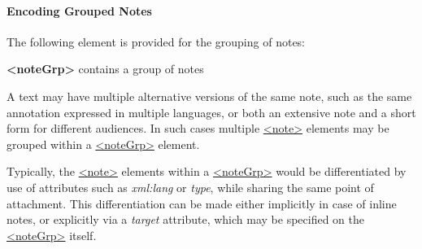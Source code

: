 \paragraph[{Encoding Grouped Notes}]{Encoding Grouped Notes}\label{CONONOGR}\par
The following element is provided for the grouping of notes: 
\begin{sansreflist}
  
\item [\textbf{<noteGrp>}] contains a group of notes
\end{sansreflist}
\par
A text may have multiple alternative versions of the same note, such as the same annotation expressed in multiple languages, or both an extensive note and a short form for different audiences. In such cases multiple \hyperref[TEI.note]{<note>} elements may be grouped within a \hyperref[TEI.noteGrp]{<noteGrp>} element.\par
Typically, the \hyperref[TEI.note]{<note>} elements within a \hyperref[TEI.noteGrp]{<noteGrp>} would be differentiated by use of attributes such as {\itshape xml:lang} or {\itshape type}, while sharing the same point of attachment. This differentiation can be made either implicitly in case of inline notes, or explicitly via a {\itshape target} attribute, which may be specified on the \hyperref[TEI.noteGrp]{<noteGrp>} itself.\par
